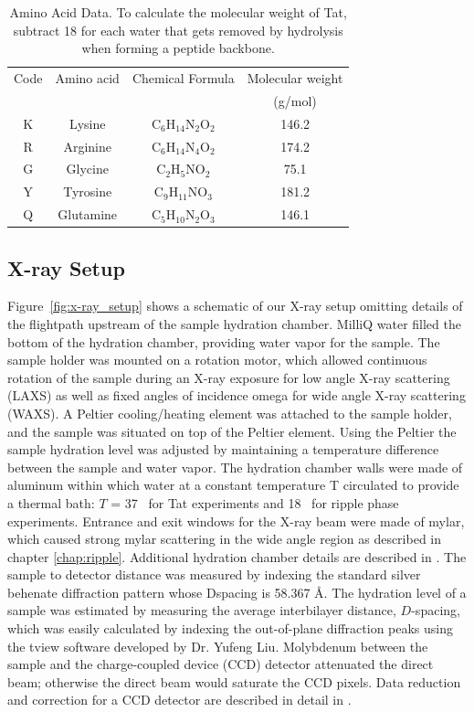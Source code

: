 \begin{table}[htbp]
  \centering
  \begin{tabular}{c c c c}
    \hline
    Code & Amino acid & Chemical Formula & Molecular weight \\
    & & & (g/mol) \\
    \hline
    K & Lysine & $\mathrm{C_6H_{14}N_2O_2}$ & 146.2 \\
    R & Arginine & $\mathrm{C_6H_{14}N_4O_2}$ & 174.2 \\
    G & Glycine & $\mathrm{C_2H_5NO_2}$ & 75.1\\
    Y & Tyrosine & $\mathrm{C_9H_{11}NO_3}$ & 181.2 \\
    Q & Glutamine & $\mathrm{C_5H_{10}N_2O_3}$ & 146.1 \\ 
    \hline
  \end{tabular}
  \caption[Amino acid data]
  {Amino Acid Data. To calculate the molecular weight of Tat,
  subtract 18 for each water that gets removed by hydrolysis when
  forming a peptide backbone.}
  \label{tab:aa}
\end{table}

\subsection{X-ray Setup}
Figure~\ref{fig:x-ray_setup} shows a schematic of our X-ray setup
omitting details of the flightpath upstream of the 
sample hydration chamber.
MilliQ water filled the bottom of the hydration chamber, providing
water vapor for the sample.
The sample holder was mounted on a rotation motor, which allowed continuous 
rotation of the sample during an X-ray exposure for low angle X-ray scattering
(\acs{LAXS}) as well as fixed angles of incidence \gls{omega} for wide angle X-ray 
scattering (\acs{WAXS}).
A Peltier cooling/heating element was attached to the sample holder, and
the sample was situated on top of the Peltier element. 
Using the Peltier the sample hydration level was adjusted by maintaining
a temperature difference between the sample and water vapor. 
The hydration chamber walls were made of aluminum within which
water at a constant temperature \gls{T} circulated to provide a thermal bath:
$T$ = 37 \textcelsius\ for Tat experiments and 18 \textcelsius\ for ripple phase 
experiments.
Entrance and exit windows for the X-ray beam were made of mylar, which
caused strong mylar scattering in the wide angle region as described in
chapter \ref{chap:ripple}.
Additional hydration chamber details are described in \cite{Kucerka05_BPJ}.
The sample to detector distance was measured by indexing the standard 
silver behenate diffraction pattern whose \gls{Dspacing} is 58.367 \AA.
The hydration level of a sample was estimated by measuring the average 
interbilayer distance, $D$-spacing, which was easily calculated by indexing the 
out-of-plane diffraction peaks using the tview software developed by Dr. Yufeng Liu.
Molybdenum between the sample and the charge-coupled device (\acs{CCD}) detector
attenuated the direct beam; otherwise the direct beam would saturate 
the CCD pixels. 
Data reduction and correction for a CCD 
detector are described in detail in \cite{Barna99}.

